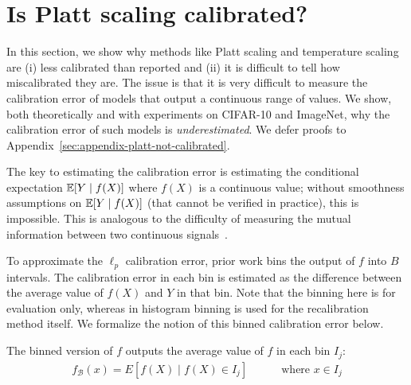 \section{Is Platt scaling calibrated?}
\label{sec:challenges-measuring}

In this section, we show why methods like Platt scaling and temperature scaling are (i) less calibrated than reported and (ii) it is difficult to tell how miscalibrated they are. The issue is that it is very difficult to measure the calibration error of models that output a continuous range of values. We show, both theoretically and with experiments on CIFAR-10 and ImageNet, why the calibration error of such models is \emph{underestimated}. We defer proofs to Appendix~\ref{sec:appendix-platt-not-calibrated}.

The key to estimating the calibration error is estimating the conditional expectation $\mathbb{E}[Y \mid f(X)]$ where $f(X)$ is a continuous value; without smoothness assumptions on $\mathbb{E}[Y \mid f(X)]$ (that cannot be verified in practice), this is impossible. This is analogous to the difficulty of measuring the mutual information between two continuous signals~\cite{paninski2003entropy}.

To approximate the $\ell_p$ calibration error, prior work bins the output of $f$ into $B$ intervals.
The calibration error in each bin is estimated as the difference between the average value of $f(X)$ and $Y$ in that bin.
Note that the binning here is for evaluation only, whereas in histogram binning is used for the recalibration method itself.
We formalize the notion of this binned calibration error below.


\begin{definition}
The binned version of $f$ outputs the average value of $f$ in each bin $I_j$:
\begin{align}
f_{\mathcal{B}}(x) = E[f(X) \mid f(X) \in I_j] \quad\quad\quad \mbox{where }x \in I_j
\end{align} 
\end{definition}

